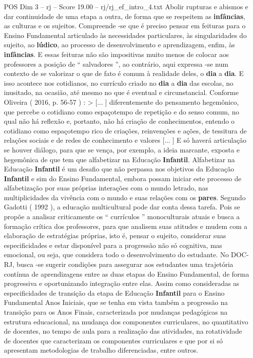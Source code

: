 \begin{textsample}{POS Dim 3 – rj – Score 19.00 – rj/rj\_ef\_intro\_4.txt}
Abolir rupturas e abismos e dar continuidade de uma etapa a outra, de forma que se respeitem as \textbf{infâncias}, as culturas e os sujeitos.
Compreende -se que é preciso pensar em feituras para o Ensino Fundamental articulado às necessidades particulares, às singularidades do sujeito, ao \textbf{lúdico}, ao processo de desenvolvimento e aprendizagem, enfim, às \textbf{infâncias}.
E essas feituras não são impositivas muito menos de colocar aos professores a posição de “ salvadores ”, ao contrário, aqui expressa -se num contexto de se valorizar o que de fato é comum à realidade deles, o \textbf{dia} a \textbf{dia}.
E isso acontece nos cotidianos, no currículo criado no \textbf{dia} a \textbf{dia} das escolas, no inusitado, na ocasião, até mesmo no que é eventual e circunstancial.
Conforme Oliveira ( 2016, p. 56-57 ) : > [... ] diferentemente do pensamento hegemônico, que percebe o cotidiano como espaçotempo de repetição e do senso comum, no qual não há reflexão e, portanto, não há criação de conhecimentos, entendo o cotidiano como espaçotempo rico de criações, reinvenções e ações, de tessitura de relações sociais e de redes de conhecimento e valores [... ] E só haverá articulação se houver diálogo, para que se vença, por exemplo, a ideia marcante, exposta e hegemônica de que tem que alfabetizar na Educação \textbf{Infantil}.
Alfabetizar na Educação \textbf{Infantil} é um desafio que não perpassa nos objetivos da Educação \textbf{Infantil} e sim do Ensino Fundamental, embora possam iniciar este processo de alfabetização por suas próprias interações com o mundo letrado, nas multiplicidades da vivência com o mundo e suas relações com os \textbf{pares}.
Segundo Gadotti ( 1992 ), a educação multicultural pode dar conta dessa tarefa.
Pois se propõe a analisar criticamente os “ currículos ” monoculturais atuais e busca a formação crítica dos professores, para que analisem suas atitudes e mudem com a elaboração de estratégias próprias, isto é, pensar o sujeito, considerar suas especificidades e estar disponível para a progressão não só cognitiva, mas emocional, ou seja, que considera todo o desenvolvimento do estudante.
No DOC-RJ, busca -se sugerir condições para assegurar aos estudantes uma trajetória contínua de aprendizagens entre as duas etapas do Ensino Fundamental, de forma progressiva e oportunizando integração entre elas.
Assim como consideradas as especificidades de transição da etapa de Educação \textbf{Infantil} para o Ensino Fundamental Anos Iniciais, que se tenha em vista também a progressão na transição para os Anos Finais, caracterizada por mudanças pedagógicas na estrutura educacional, na mudança dos componentes curriculares, no quantitativo de docentes, no tempo de aula para a realização das atividades, na rotatividade de docentes que caracterizam os componentes curriculares e que por si só apresentam metodologias de trabalho diferenciadas, entre outros.

\end{textsample}
